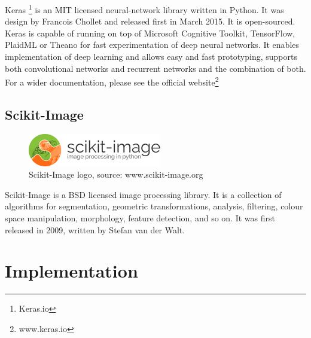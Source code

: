 Keras \footnote{Keras.io} is an MIT licensed neural-network library written in Python. It was design by Francois Chollet and released first in March 2015. It is open-sourced. Keras is capable of running on top of Microsoft Cognitive Toolkit, TensorFlow, PlaidML or Theano for fast experimentation of deep neural networks. It enables implementation of deep learning and allows easy and 
fast prototyping, supports both convolutional networks and recurrent networks and the combination of both. For a wider documentation, please see the official website\footnote{www.keras.io}

\subsection{ Scikit-Image}
\begin{figure}[H]
    \centering
    \includegraphics[width=0.7\linewidth]{images/Scikit-image.png}
     \caption{Scikit-Image logo, source: www.scikit-image.org}
  \end{figure}

Scikit-Image is a BSD licensed image processing library. It is a collection of algorithms for segmentation, 
geometric transformations, analysis, filtering, colour space manipulation, morphology, feature detection, and so on. It was first released in 2009, written by Stefan van der Walt.
\cleardoublepage
\section{Implementation}
